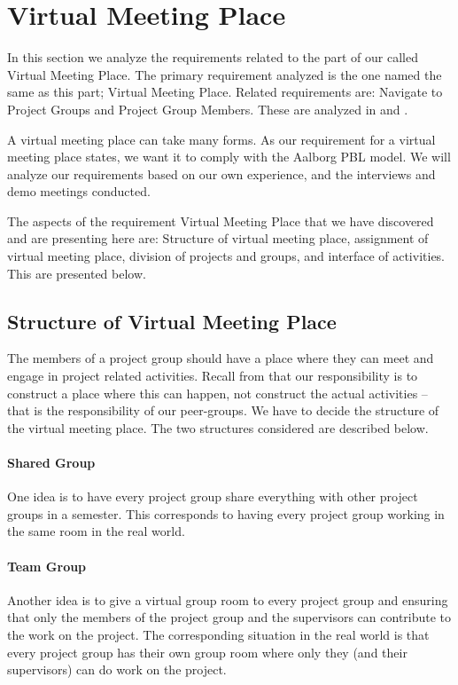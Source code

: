 \section{Virtual Meeting Place}
\label{sec:virtualMeetingPlace}
\label{sec:projectgroup}
In this section we analyze the requirements related to the part of our \subsystem{} called Virtual Meeting Place.
The primary requirement analyzed is the one named the same as this part; Virtual Meeting Place.
Related requirements are: Navigate to Project Groups and Project Group Members.
These are analyzed in  and .

A virtual meeting place can take many forms.
As our requirement for a virtual meeting place states, we want it to comply with the Aalborg PBL model.
We will analyze our requirements based on our own experience, and the interviews and demo meetings conducted.

The aspects of the requirement Virtual Meeting Place that we have discovered and are presenting here are: Structure of virtual meeting place, assignment of virtual meeting place, division of projects and groups, and interface of activities.
This are presented below.


\subsection{Structure of Virtual Meeting Place}
The members of a project group should have a place where they can meet and engage in project related activities.
Recall from  that our responsibility is to construct a place where this can happen, not construct the actual activities -- that is the responsibility of our peer-groups.
We have to decide the structure of the virtual meeting place.
The two structures considered are described below.

\paragraph{Shared Group} One idea is to have every project group share everything with other project groups in a semester.
This corresponds to having every project group working in the same room in the real world.

\paragraph{Team Group} Another idea is to give a virtual group room to every project group and ensuring that only the members of the project group and the supervisors can contribute to the work on the project.
The corresponding situation in the real world is that every project group has their own group room where only they (and their supervisors) can do work on the project. \\


